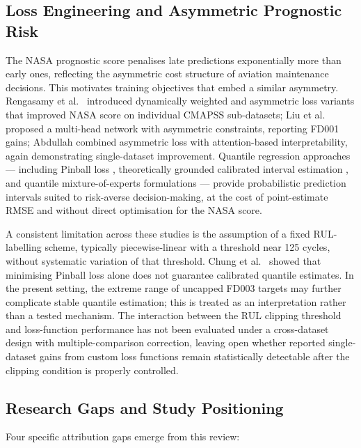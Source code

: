 \documentclass[review,12pt]{elsarticle}
\begin{document}
\subsection{Loss Engineering and Asymmetric Prognostic Risk}

The NASA prognostic score penalises late predictions exponentially more than early ones, reflecting the asymmetric cost structure of aviation maintenance decisions. This motivates training objectives that embed a similar asymmetry. Rengasamy et al.\ \cite{ref37,ref38} introduced dynamically weighted and asymmetric loss variants that improved NASA score on individual CMAPSS sub-datasets; Liu et al.\ \cite{ref39} proposed a multi-head network with asymmetric constraints, reporting FD001 gains; Abdullah \cite{ref22} combined asymmetric loss with attention-based interpretability, again demonstrating single-dataset improvement. Quantile regression approaches --- including Pinball loss \cite{ref40}, theoretically grounded calibrated interval estimation \cite{ref41}, and quantile mixture-of-experts formulations \cite{ref43} --- provide probabilistic prediction intervals suited to risk-averse decision-making, at the cost of point-estimate RMSE and without direct optimisation for the NASA score.

A consistent limitation across these studies is the assumption of a fixed RUL-labelling scheme, typically piecewise-linear with a threshold near 125 cycles, without systematic variation of that threshold. Chung et al.\ \cite{ref41} showed that minimising Pinball loss alone does not guarantee calibrated quantile estimates. In the present setting, the extreme range of uncapped FD003 targets may further complicate stable quantile estimation; this is treated as an interpretation rather than a tested mechanism. The interaction between the RUL clipping threshold and loss-function performance has not been evaluated under a cross-dataset design with multiple-comparison correction, leaving open whether reported single-dataset gains from custom loss functions remain statistically detectable after the clipping condition is properly controlled.

\subsection{Research Gaps and Study Positioning}

Four specific attribution gaps emerge from this review:
\end{document}
